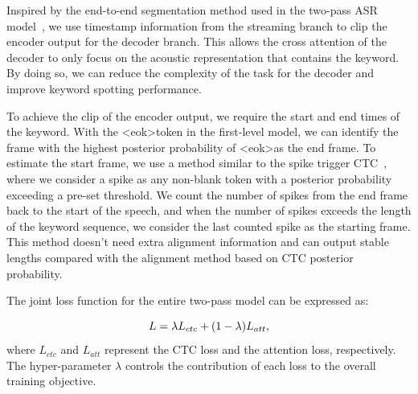 \documentclass{article}
\begin{document}
Inspired by the end-to-end segmentation method used in the two-pass ASR model~\cite{seg}, we use timestamp information from the streaming branch to clip the encoder output for the decoder branch. This allows the cross attention of the decoder to only focus on the acoustic representation that contains the keyword. By doing so, we can reduce the complexity of the task for the decoder and improve keyword spotting performance.

To achieve the clip of the encoder output, we require the start and end times of the keyword. With the \textless eok\textgreater\enspace token in the first-level model, we can identify the frame with the highest posterior probability of \textless eok\textgreater\enspace as the end frame. To estimate the start frame, we use a method similar to the spike trigger CTC~\cite{spike}, where we consider a spike as any non-blank token with a posterior probability exceeding a pre-set threshold. We count the number of spikes from the end frame back to the start of the speech, and when the number of spikes exceeds the length of the keyword sequence, we consider the last counted spike as the starting frame. This method doesn't need extra alignment information and can output stable lengths compared with the alignment method based on CTC posterior probability.

The joint loss function for the entire two-pass model can be expressed as:

\begin{equation}
\setlength\abovedisplayskip{6pt}
\setlength\belowdisplayskip{6pt}
L=\lambda L_{ctc}+(1-\lambda) L_{att},
\end{equation}
where $L_{ctc}$  and $L_{att}$ represent the CTC loss and the attention loss, respectively. The hyper-parameter $\lambda$ controls the contribution of each loss to the overall training objective.
\vspace{-10pt}
\end{document}

